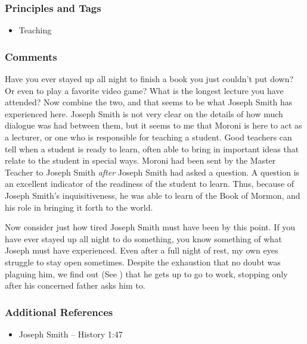 \documentclass[12pt]{report}
\begin{document}
\subsubsection{Principles and Tags\label{js:principles14}}
\begin{itemize}
\item {}Teaching
\end{itemize}

\subsubsection{Comments\label{js:comments14}}
Have you ever stayed up all night to finish a book you just couldn't put down?  Or even to play a favorite video game?  What is the longest lecture you have attended?  Now combine the two, and that seems to be what Joseph Smith has experienced here.  Joseph Smith is not very clear on the details of how much dialogue was had between them, but it seems to me that Moroni is here to act as a lecturer, or one who is responsible for teaching a student.  Good teachers can tell when a student is ready to learn, often able to bring in important ideas that relate to the student in special ways.  Moroni had been sent by the Master Teacher to Joseph Smith \emph{after} Joseph Smith had asked a question.  A question is an excellent indicator of the readiness of the student to learn.  Thus, because of Joseph Smith's inquisitiveness, he was able to learn of the Book of Mormon, and his role in bringing it forth to the world.

Now consider just how tired Joseph Smith must have been by this point.  If you have ever stayed up all night to do something, you know something of what Joseph must have experienced.  Even after a full night of rest, my own eyes struggle to stay open sometimes.  Despite the exhaustion that no doubt was plaguing him, we find out (See ) that he gets up to go to work, stopping only after his concerned father asks him to.

\subsubsection{Additional References\label{js:references14}}
\begin{itemize}
\item Joseph Smith -- History 1:47
\end{itemize}
\end{document}
